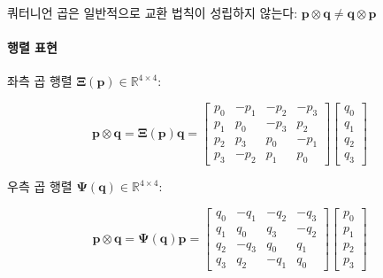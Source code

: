             쿼터니언 곱은 일반적으로 교환 법칙이 성립하지 않는다:
            $\mathbf{p} \otimes \mathbf{q} \neq \mathbf{q} \otimes \mathbf{p}$

        \paragraph{행렬 표현}
            좌측 곱 행렬 $\boldsymbol{\Xi}(\mathbf{p}) \in \mathbb{R}^{4\times 4}$:

            \begin{equation}
                \mathbf{p} \otimes \mathbf{q} = \boldsymbol{\Xi}(\mathbf{p})\mathbf{q} =
                \begin{bmatrix}
                    p_0 & -p_1 & -p_2 & -p_3 \\
                    p_1 &  p_0 & -p_3 &  p_2 \\
                    p_2 &  p_3 &  p_0 & -p_1 \\
                    p_3 & -p_2 &  p_1 &  p_0
                \end{bmatrix}
                \begin{bmatrix} q_0 \\ q_1 \\ q_2 \\ q_3 \end{bmatrix}
                \tag{A.7}
            \end{equation}
            
            우측 곱 행렬 $\boldsymbol{\Psi}(\mathbf{q}) \in \mathbb{R}^{4\times 4}$:
            
            \begin{equation}
                \mathbf{p} \otimes \mathbf{q} = \boldsymbol{\Psi}(\mathbf{q})\mathbf{p} =
                \begin{bmatrix}
                    q_0 & -q_1 & -q_2 & -q_3 \\
                    q_1 &  q_0 &  q_3 & -q_2 \\
                    q_2 & -q_3 &  q_0 &  q_1 \\
                    q_3 &  q_2 & -q_1 &  q_0
                \end{bmatrix}
                \begin{bmatrix} p_0 \\ p_1 \\ p_2 \\ p_3 \end{bmatrix}
                \tag{A.8}
            \end{equation}
 
